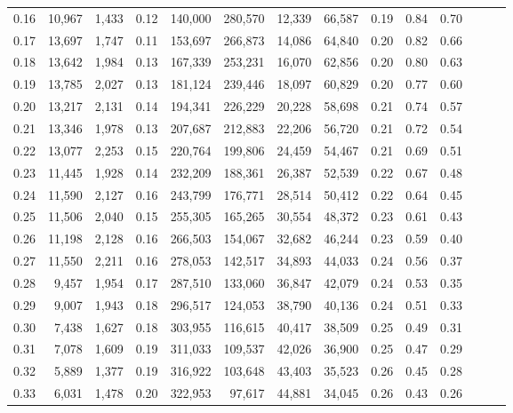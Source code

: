 \begin{tabular}{rrrrrrrrrrrrrr}
0.16 &  10,967 &  1,433 &  0.12 &  140,000 &  280,570 &  12,339 &  66,587 &  0.19 &  0.84 &      0.70 \\
0.17 &  13,697 &  1,747 &  0.11 &  153,697 &  266,873 &  14,086 &  64,840 &  0.20 &  0.82 &      0.66 \\
0.18 &  13,642 &  1,984 &  0.13 &  167,339 &  253,231 &  16,070 &  62,856 &  0.20 &  0.80 &      0.63 \\
0.19 &  13,785 &  2,027 &  0.13 &  181,124 &  239,446 &  18,097 &  60,829 &  0.20 &  0.77 &      0.60 \\
0.20 &  13,217 &  2,131 &  0.14 &  194,341 &  226,229 &  20,228 &  58,698 &  0.21 &  0.74 &      0.57 \\
0.21 &  13,346 &  1,978 &  0.13 &  207,687 &  212,883 &  22,206 &  56,720 &  0.21 &  0.72 &      0.54 \\
0.22 &  13,077 &  2,253 &  0.15 &  220,764 &  199,806 &  24,459 &  54,467 &  0.21 &  0.69 &      0.51 \\
0.23 &  11,445 &  1,928 &  0.14 &  232,209 &  188,361 &  26,387 &  52,539 &  0.22 &  0.67 &      0.48 \\
0.24 &  11,590 &  2,127 &  0.16 &  243,799 &  176,771 &  28,514 &  50,412 &  0.22 &  0.64 &      0.45 \\
0.25 &  11,506 &  2,040 &  0.15 &  255,305 &  165,265 &  30,554 &  48,372 &  0.23 &  0.61 &      0.43 \\
0.26 &  11,198 &  2,128 &  0.16 &  266,503 &  154,067 &  32,682 &  46,244 &  0.23 &  0.59 &      0.40 \\
0.27 &  11,550 &  2,211 &  0.16 &  278,053 &  142,517 &  34,893 &  44,033 &  0.24 &  0.56 &      0.37 \\
0.28 &   9,457 &  1,954 &  0.17 &  287,510 &  133,060 &  36,847 &  42,079 &  0.24 &  0.53 &      0.35 \\
0.29 &   9,007 &  1,943 &  0.18 &  296,517 &  124,053 &  38,790 &  40,136 &  0.24 &  0.51 &      0.33 \\
0.30 &   7,438 &  1,627 &  0.18 &  303,955 &  116,615 &  40,417 &  38,509 &  0.25 &  0.49 &      0.31 \\
0.31 &   7,078 &  1,609 &  0.19 &  311,033 &  109,537 &  42,026 &  36,900 &  0.25 &  0.47 &      0.29 \\
0.32 &   5,889 &  1,377 &  0.19 &  316,922 &  103,648 &  43,403 &  35,523 &  0.26 &  0.45 &      0.28 \\
0.33 &   6,031 &  1,478 &  0.20 &  322,953 &   97,617 &  44,881 &  34,045 &  0.26 &  0.43 &      0.26 \\

\end{tabular}
